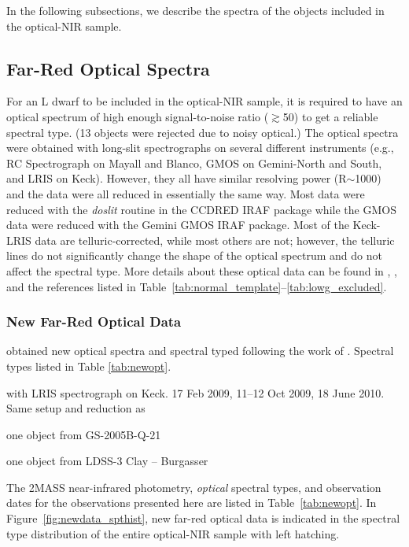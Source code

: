 \documentclass[12pt,preprint]{aastex}
\begin{document}
In the following subsections, we describe the spectra of the objects included in the optical-NIR sample.

\subsection{Far-Red Optical Spectra}

For an L dwarf to be included in the optical-NIR sample, it is required to have an optical spectrum of high enough signal-to-noise ratio ($\gtrsim$50) to get a reliable spectral type. (13 objects were rejected due to noisy optical.)
The optical spectra were obtained with long-slit spectrographs on several different instruments (e.g., RC Spectrograph on Mayall and Blanco, GMOS on Gemini-North and South, and LRIS on Keck). However, they all have similar resolving power (R$\sim$1000) and the data were all reduced in essentially the same way. Most data were reduced with the \emph{doslit} routine in the CCDRED IRAF package while the GMOS data were reduced with the Gemini GMOS IRAF package. Most of the Keck-LRIS data are telluric-corrected, while most others are not; however, the telluric lines do not significantly change the shape of the optical spectrum and do not affect the spectral type. More details about these optical data can be found in \citet{Cruz07}, \citet{Reid08}, \citet{Cruz09_lowg} and the references listed in Table~\ref{tab:normal_template}--\ref{tab:lowg_excluded}.


\subsubsection{New Far-Red Optical Data}
\label{sec:obs_new_opt}
obtained new optical spectra and spectral typed following the work of \cite{Cruz09_lowg}. 
Spectral types listed in Table \ref{tab:newopt}.

with LRIS spectrograph on Keck. 17 Feb 2009, 11--12 Oct 2009, 18 June 2010. Same setup and reduction as \cite{Cruz09_lowg}

one object from GS-2005B-Q-21 \cite{Reid08}

one object from LDSS-3 Clay -- Burgasser

The 2MASS near-infrared photometry, \emph{optical} spectral types, and observation dates for the observations presented here are listed in Table~\ref{tab:newopt}. In Figure~\ref{fig:newdata_spthist}, new far-red optical data is indicated in the spectral type distribution of the entire optical-NIR sample with left hatching.
\end{document}
